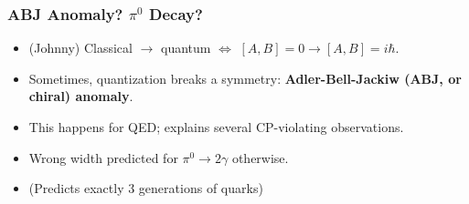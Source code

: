 \documentclass[10pt]{beamer}
\begin{document}
\begin{frame}
  \frametitle{ABJ Anomaly? $\pi^{0}$ Decay?}

  \begin{itemize}
  \item (Johnny) Classical $\to$ quantum $\Leftrightarrow$ $[A, B] = 0 \to [A, B] = i\hbar$.
  \item Sometimes, quantization breaks a symmetry: \textbf{Adler-Bell-Jackiw (ABJ, or chiral) anomaly}.
  \item This happens for QED; explains several CP-violating observations.
  \item Wrong width predicted for $\pi^{0} \to 2\gamma$ otherwise.
  \item (Predicts exactly 3 generations of quarks)
  \end{itemize}
\end{frame}
\end{document}
